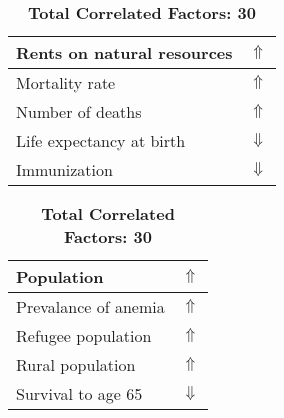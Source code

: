 \documentclass[12pt,notitlepage,oneside]{report}
\begin{document}
\begin{table}[!htb]
\begin{tabular}{|l|l|}
Rents on natural resources & $\Uparrow$\\ \hline
Mortality rate & $\Uparrow$\\ \hline
Number of deaths & $\Uparrow$\\ \hline
Life expectancy at birth & $\Downarrow$\\ \hline
Immunization & $\Downarrow$\\ \hline
\end{tabular}
\begin{tabular}{|l|l|}
\hline
Population & $\Uparrow$\\ \hline
Prevalance of anemia & $\Uparrow$\\ \hline
Refugee population & $\Uparrow$\\ \hline
Rural population & $\Uparrow$\\ \hline
Survival to age 65 & $\Downarrow$\\ \hline
\end{tabular}
\caption*{\textbf{Total Correlated Factors: 30}}
\end{table}
\clearpage
\end{document}
